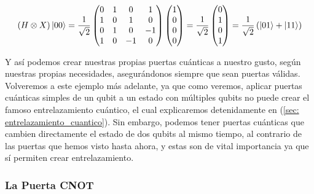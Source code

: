 \documentclass[12pt]{article}
\numberwithin{equation}{section} %
\begin{document}
    \begin{equation*}
        \left( H \otimes X \right) \ket{0 0} =  \frac{1}{\sqrt{2}} \begin{pmatrix}
            0 & 1 & 0 & 1 \\
            1 & 0 & 1 & 0 \\
            0 & 1 & 0 & -1 \\
            1 & 0 & -1 & 0
        \end{pmatrix} \begin{pmatrix}
            1 \\
            0 \\
            0 \\
            0
        \end{pmatrix} = \frac{1}{\sqrt{2}} \begin{pmatrix}
            0 \\ 
            1 \\
            0 \\
            1
        \end{pmatrix} = \frac{1}{\sqrt{2}} \left( \ket{0 1} + \ket{1 1} \right)
    \end{equation*}

    \vspace{2.5mm}

    Y así podemos crear nuestras propias puertas cuánticas a nuestro gusto, según nuestras propias necesidades, asegurándonos siempre que sean puertas válidas. Volveremos a este ejemplo más adelante, ya que como veremos, aplicar puertas cuánticas simples de un qubit a un estado con múltiples qubits no puede crear el famoso entrelazamiento cuántico, el cual explicaremos detenidamente en (\ref{sec: entrelazamiento_cuantico}). Sin embargo, podemos tener puertas cuánticas que cambien directamente el estado de dos qubits al mismo tiempo, al contrario de las puertas que hemos visto hasta ahora, y estas son de vital importancia ya que sí permiten crear entrelazamiento. 

    \vspace{5mm}





    \subsubsection{La Puerta CNOT}\label{subsubsection: la_puerta_cnot}

    \vspace{5mm}
\end{document}
